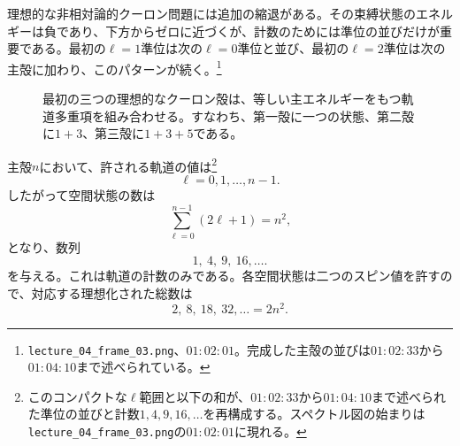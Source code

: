 理想的な非相対論的クーロン問題には追加の縮退がある。その束縛状態のエネルギーは負であり、下方からゼロに近づくが、計数のためには準位の並びだけが重要である。最初の\(\ell=1\)準位は次の\(\ell=0\)準位と並び、最初の\(\ell=2\)準位は次の主殻に加わり、このパターンが続く。\footnote{\texttt{lecture\_04\_frame\_03.png}、\(01{:}02{:}01\)。完成した主殻の並びは\(01{:}02{:}33\)から\(01{:}04{:}10\)まで述べられている。}

\begin{figure}[htbp]
\centering
{}
\caption{最初の三つの理想的なクーロン殻は、等しい主エネルギーをもつ軌道多重項を組み合わせる。すなわち、第一殻に一つの状態、第二殻に\(1+3\)、第三殻に\(1+3+5\)である。}
\end{figure}

主殻\(n\)において、許される軌道の値は\footnote{このコンパクトな\(\ell\)範囲と以下の和が、\(01{:}02{:}33\)から\(01{:}04{:}10\)まで述べられた準位の並びと計数\(1,4,9,16,\ldots\)を再構成する。スペクトル図の始まりは\texttt{lecture\_04\_frame\_03.png}の\(01{:}02{:}01\)に現れる。}
\[
\ell=0,1,\ldots,n-1.
\]
したがって空間状態の数は
\begin{equation}
\sum_{\ell=0}^{n-1}(2\ell+1)=n^{2},
\end{equation}
となり、数列
\begin{equation}
1,\ 4,\ 9,\ 16,\ldots .
\end{equation}
を与える。これは軌道の計数のみである。各空間状態は二つのスピン値を許すので、対応する理想化された総数は
\begin{equation}
2,\ 8,\ 18,\ 32,\ldots=2n^{2}.
\end{equation}

